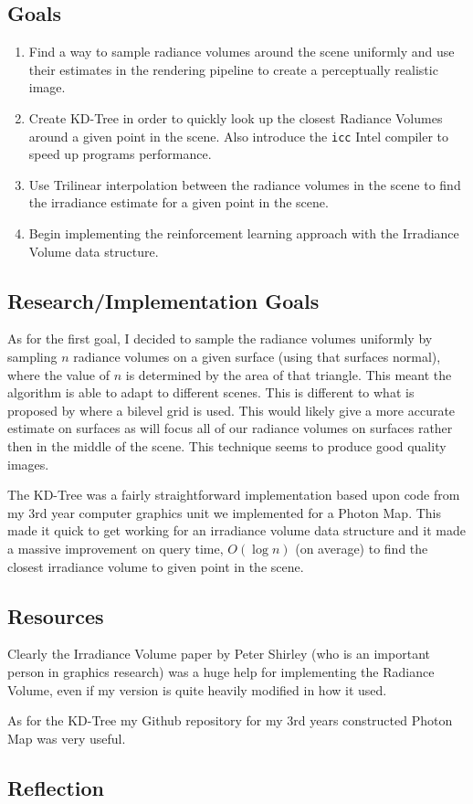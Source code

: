 \documentclass[conference]{IEEEtran}
\begin{document}
\subsection{Goals}
\begin{enumerate}
\item Find a way to sample radiance volumes around the scene uniformly and use their estimates in the rendering pipeline to create a perceptually realistic image.
\item Create KD-Tree in order to quickly look up the closest Radiance Volumes around a given point in the scene. Also introduce the \verb|icc| Intel compiler to speed up programs performance.
\item Use Trilinear interpolation between the radiance volumes in the scene to find the irradiance estimate for a given point in the scene.
\item Begin implementing the reinforcement learning approach with the Irradiance Volume data structure.
\end{enumerate}

\subsection{Research/Implementation Goals}
As for the first goal, I decided to sample the radiance volumes uniformly by sampling $n$ radiance volumes on a given surface (using that surfaces normal), where the value of $n$ is determined by the area of that triangle. This meant the algorithm is able to adapt to different scenes. This is different to what is proposed by \cite{greger1998irradiance} where a bilevel grid is used. This would likely give a more accurate estimate on surfaces as will focus all of our radiance volumes on surfaces rather then in the middle of the scene. This technique seems to produce good quality images.

The KD-Tree was a fairly straightforward implementation based upon code from my 3rd year computer graphics unit we implemented for a Photon Map. This made it quick to get working for an irradiance volume data structure and it made a massive improvement on query time, $O(\log{n})$ (on average) to find the closest irradiance volume to given point in the scene.

\subsection{Resources}
Clearly the Irradiance Volume paper \cite{greger1998irradiance} by Peter Shirley (who is an important person in graphics research) was a huge help for implementing the Radiance Volume, even if my version is quite heavily modified in how it used. 

As for the KD-Tree my Github repository for my 3rd years constructed Photon Map was very useful. 

\subsection{Reflection}




\end{document}
